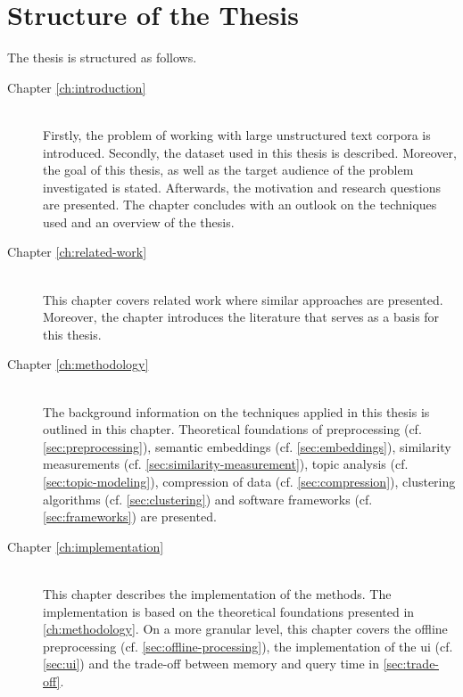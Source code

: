 
\section{Structure of the Thesis}\label{sec:structure-of-the-thesis}
The thesis is structured as follows.

\begin{description}
    \item[Chapter \ref{ch:introduction}] \hfill \\
        Firstly, the problem of working with large unstructured text corpora is introduced.
        Secondly, the dataset used in this thesis is described.
        Moreover, the goal of this thesis, as well as
        the target audience of the problem investigated is stated.
        Afterwards, the motivation and research questions are presented.
        The chapter concludes with an outlook on the techniques used and an overview of the thesis.
    
    \item[Chapter \ref{ch:related-work}] \hfill \\
        This chapter covers related work where similar approaches are presented.
        Moreover, the chapter introduces the literature that serves as a basis for this thesis.

    \item[Chapter \ref{ch:methodology}] \hfill \\
        The background information on the techniques applied in this thesis is outlined in this chapter.
        Theoretical foundations of preprocessing (cf. \autoref{sec:preprocessing}), 
        semantic embeddings (cf. \autoref{sec:embeddings}), 
        similarity measurements (cf. \autoref{sec:similarity-measurement}),
        topic analysis (cf. \autoref{sec:topic-modeling}),
        compression of data (cf. \autoref{sec:compression}),
        clustering algorithms (cf. \autoref{sec:clustering})
        and software frameworks (cf. \autoref{sec:frameworks})
        are presented.

    \item[Chapter \ref{ch:implementation}] \hfill \\  
        This chapter describes the implementation of the methods.
        The implementation is based on the theoretical foundations presented in \autoref{ch:methodology}.
        On a more granular level, this chapter covers the offline preprocessing (cf. \autoref{sec:offline-processing}),
        the implementation of the \ac{ui} (cf. \autoref{sec:ui})
        and the trade-off between memory and query time in \autoref{sec:trade-off}.


\end{description}
